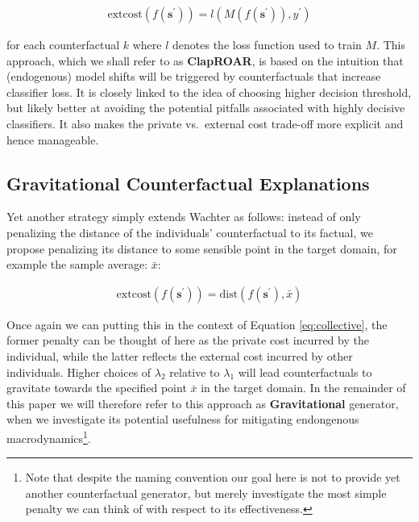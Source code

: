 \documentclass[conference,final,]{IEEEtran}
\theoremstyle{definition}
\theoremstyle{definition}
\theoremstyle{definition}
\theoremstyle{definition}
\theoremstyle{remark}
\begin{document}
\begin{equation}
\begin{aligned}
\text{extcost}(f(\mathbf{s}^\prime)) = l(M(f(\mathbf{s}^\prime)),y^\prime) \label{eq:clap}
\end{aligned}
\end{equation}

for each counterfactual \(k\) where \(l\) denotes the loss function used to train \(M\). This approach, which we shall refer to as \textbf{ClapROAR}, is based on the intuition that (endogenous) model shifts will be triggered by counterfactuals that increase classifier loss. It is closely linked to the idea of choosing higher decision threshold, but likely better at avoiding the potential pitfalls associated with highly decisive classifiers. It also makes the private vs.~external cost trade-off more explicit and hence manageable.

\hypertarget{gravitational-counterfactual-explanations}{%
\subsection{Gravitational Counterfactual Explanations}\label{gravitational-counterfactual-explanations}}

Yet another strategy simply extends Wachter as follows: instead of only penalizing the distance of the individuals' counterfactual to its factual, we propose penalizing its distance to some sensible point in the target domain, for example the sample average: \(\bar{x}\):

\begin{equation}
\begin{aligned}
\text{extcost}(f(\mathbf{s}^\prime)) = \text{dist}(f(\mathbf{s}^\prime),\bar{x})  \label{eq:grav}
\end{aligned}
\end{equation}

Once again we can putting this in the context of Equation \eqref{eq:collective}, the former penalty can be thought of here as the private cost incurred by the individual, while the latter reflects the external cost incurred by other individuals. Higher choices of \(\lambda_2\) relative to \(\lambda_1\) will lead counterfactuals to gravitate towards the specified point \(\bar{x}\) in the target domain. In the remainder of this paper we will therefore refer to this approach as \textbf{Gravitational} generator, when we investigate its potential usefulness for mitigating endongenous macrodynamics\footnote{Note that despite the naming convention our goal here is not to provide yet another counterfactual generator, but merely investigate the most simple penalty we can think of with respect to its effectiveness.}.
\end{document}
